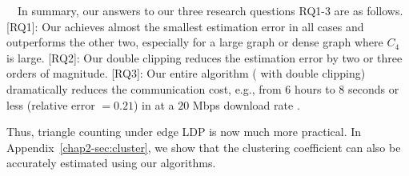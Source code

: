 
\smallskip
{}~~In summary, our answers to our three research questions RQ1-3 
are as follows. 
[RQ1]: Our \AlgTwo{} achieves almost the smallest estimation error in all cases and outperforms the other two, especially for a large graph or dense graph where $C_4$ is large. 
[RQ2]: Our double clipping reduces the estimation error by two or three orders of magnitude. 
[RQ3]: Our entire algorithm (\AlgTwo{} with double clipping) dramatically reduces the communication cost, 
e.g., 
from $6$ hours to $8$ seconds or less (relative error $=0.21$) in \IMDB{} at a $20$ Mbps download rate \cite{YouTube_speed}. 

Thus, triangle counting under edge LDP is now 
much more 
practical. 
In Appendix~\ref{chap2-sec:cluster}, we show that the clustering coefficient can also be accurately estimated using our algorithms.
